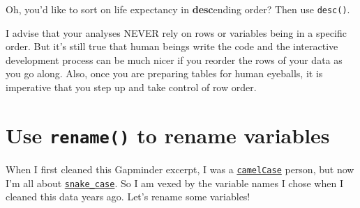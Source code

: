 \documentclass[
]{book}
\newenvironment{Shaded}{\begin{snugshade}}{\end{snugshade}}
\newcommand{\CommentTok}[1]{\textcolor[rgb]{0.56,0.35,0.01}{\textit{#1}}}
\newcommand{\DecValTok}[1]{\textcolor[rgb]{0.00,0.00,0.81}{#1}}
\newcommand{\KeywordTok}[1]{\textcolor[rgb]{0.13,0.29,0.53}{\textbf{#1}}}
\newcommand{\NormalTok}[1]{#1}
\newcommand{\OperatorTok}[1]{\textcolor[rgb]{0.81,0.36,0.00}{\textbf{#1}}}
\newcommand{\StringTok}[1]{\textcolor[rgb]{0.31,0.60,0.02}{#1}}
\begin{document}
Oh, you'd like to sort on life expectancy in \textbf{desc}ending order? Then use \texttt{desc()}.

\begin{Shaded}
\end{Shaded}

I advise that your analyses NEVER rely on rows or variables being in a specific order. But it's still true that human beings write the code and the interactive development process can be much nicer if you reorder the rows of your data as you go along. Also, once you are preparing tables for human eyeballs, it is imperative that you step up and take control of row order.

\hypertarget{use-rename-to-rename-variables}{%
\section{\texorpdfstring{Use \texttt{rename()} to rename variables}{Use rename() to rename variables}}\label{use-rename-to-rename-variables}}

When I first cleaned this Gapminder excerpt, I was a \href{https://en.wikipedia.org/wiki/Camel_case}{\texttt{camelCase}} person, but now I'm all about \href{https://en.wikipedia.org/wiki/Snake_case}{\texttt{snake\_case}}. So I am vexed by the variable names I chose when I cleaned this data years ago. Let's rename some variables!
\end{document}
